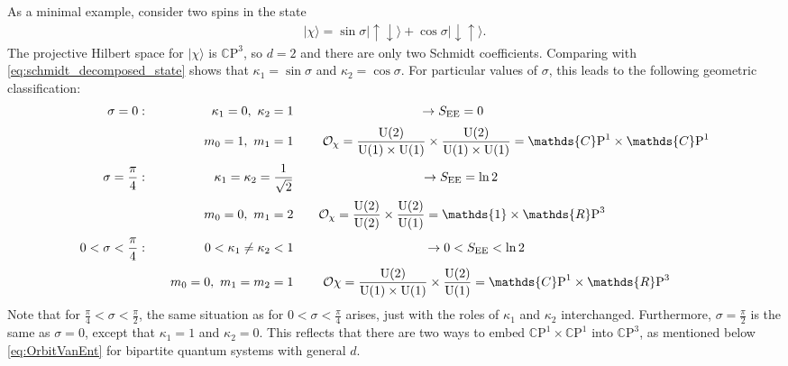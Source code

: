 \documentclass[a4paper,11pt]{article}
\newcommand{\CP}[1]{\mathds{C}\text{P}^{#1}}
\newcommand{\RP}[1]{\mathds{R}\text{P}^{#1}}
\newcommand{\U}{\text{U}}
\newcommand{\1}{\mathds{1}}
\begin{document}
As a minimal example, consider two spins in the state
\begin{align}
    |\chi\rangle=\sin\sigma|\!\uparrow\downarrow\rangle+\cos\sigma|\!\downarrow\uparrow\rangle.
\end{align}
The projective Hilbert space for $|\chi\rangle$ is $\CP{3}$, so $d=2$ and there are only two Schmidt coefficients. Comparing with \eqref{eq:schmidt_decomposed_state} shows that $\kappa_1=\sin\sigma$ and $\kappa_2=\cos\sigma$. For particular values of $\sigma$, this leads to the following geometric classification:
\begin{align}
    \sigma=0: & \quad & \kappa_1=0,~\kappa_2=1 & \quad & \to S_{\text{EE}}=0\hspace{6.3cm}\notag\\[2pt]
    ~ & \quad & m_0=1,~m_1=1 & \quad & \mathcal{O}_\chi=\frac{\U(2)}{\U(1)\times\U(1)}\times\frac{\U(2)}{\U(1)\times\U(1)}=\CP{1}\times\CP{1}\notag\\[2pt]
    \sigma=\frac{\pi}{4}: & \quad & \kappa_1=\kappa_2=\frac{1}{\sqrt{2}} & \quad & \to S_{\text{EE}}=\ln2\hspace{5.9cm}\notag\\[2pt]
    ~ & \quad & m_0=0,~m_1=2 & \quad & \mathcal{O}_\chi=\frac{\U(2)}{\U(2)}\times\frac{\U(2)}{\U(1)}=\mathds{1}\times\RP{3}\hspace{2.9cm}\notag\\[2pt]
    0<\sigma<\frac{\pi}{4}: & \quad & 0<\kappa_1\neq\kappa_2<1 & \quad & \to0<S_{\text{EE}}<\ln2\hspace{5.15cm}\notag\\[2pt]
    ~ & \quad & m_0=0,~m_1=m_2=1 & \quad & \mathcal{O}\chi=\frac{\U(2)}{\U(1)\times\U(1)}\times\frac{\U(2)}{\U(1)}=\CP{1}\times\RP{3}\hspace{1.1cm}\notag
\end{align}
Note that for $\frac{\pi}{4}<\sigma<\frac{\pi}{2}$, the same situation as for $0<\sigma<\frac{\pi}{4}$ arises, just with the roles of $\kappa_1$ and $\kappa_2$ interchanged. Furthermore, $\sigma=\frac{\pi}{2}$ is the same as $\sigma=0$, except that $\kappa_1=1$ and $\kappa_2=0$. This reflects that there are two ways to embed $\CP{1}\times\CP{1}$ into $\CP{3}$, as mentioned below \eqref{eq:OrbitVanEnt} for bipartite quantum systems with general $d$.



\end{document}
